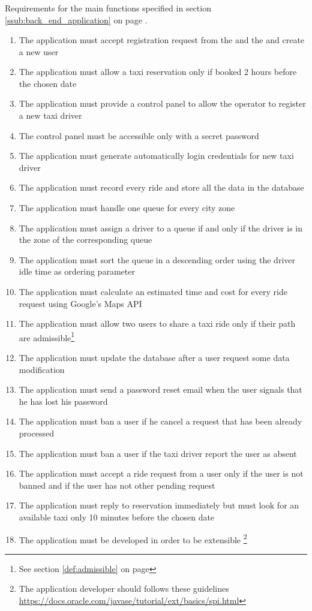 \subsubsection{}
\label{subs:backend_requirements}
Requirements for the main functions specified in section \ref{ssub:back_end_application} on page \pageref{ssub:back_end_application}.
\begin{enumerate}[resume*]
	\item The application must accept registration request from the  and the  and create a new user
	\item The application must allow a taxi reservation only if booked 2 hours before the chosen date
	\item The application must provide a control panel to allow the operator to register a new taxi driver
	\item The control panel must be accessible only with a secret password
	\item The application must generate automatically login credentials for new taxi driver
	\item The application must record every ride and store all the data in the database
	\item The application must handle one queue for every city zone
	\item The application must assign a driver to a queue if and only if the driver is in the zone of the corresponding queue
	\item The application must sort the queue in a descending order using the driver idle time as ordering parameter
	\item The application must calculate an estimated time and cost for every ride request using Google's Maps API
	\item The application must allow two users to share a taxi ride only if their path are admissible\footnote{See section \ref{def:admissible} on page \pageref{def:admissible}}
	\item The application must update the database after a user request some data modification
	\item The application must send a password reset email when the user signals that he has lost his password
	\item The application must ban a user if he cancel a request that has been already processed
	\item The application must ban a user if the taxi driver report the user as absent
	\item The application must accept a ride request from a user only if the user is not banned and if the user has not other pending request
	\item The application must reply to reservation immediately but must look for an available taxi only 10 minutes before the chosen date
	\item The application must be developed in order to be extensible \footnote{The application developer should follows these guidelines \url{https://docs.oracle.com/javase/tutorial/ext/basics/spi.html}}


\end{enumerate}


